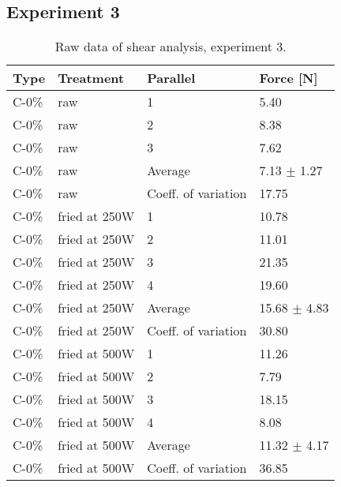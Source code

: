 \subsection{Experiment 3}
\begin{table}[H]
    \caption{Raw data of shear analysis, experiment 3.}
    \centering
    \begin{tabular}{lll|l}
\toprule

\textbf{Type} & \textbf{Treatment} & \textbf{Parallel} & \textbf{Force [N]}\\

\hline
C-0\% & raw   &   1       & 5.40 \\
C-0\% & raw   &   2       & 8.38 \\
C-0\% & raw   &   3       & 7.62 \\
C-0\% & raw   & Average   & 7.13 $\pm$ 1.27\\
C-0\% & raw   & Coeff. of variation & 17.75 \\
\hline
C-0\% & fried at 250W      &   1       & 10.78 \\
C-0\% & fried at 250W      &   2       & 11.01 \\
C-0\% & fried at 250W      &   3       & 21.35 \\
C-0\% & fried at 250W      &   4       & 19.60 \\
C-0\% & fried at 250W      & Average   & 15.68 $\pm$ 4.83 \\
C-0\% & fried at 250W      & Coeff. of variation & 30.80 \\
\hline
C-0\% & fried at 500W      &   1       & 11.26 \\
C-0\% & fried at 500W      &   2       & 7.79 \\
C-0\% & fried at 500W      &   3       & 18.15 \\
C-0\% & fried at 500W      &   4       & 8.08 \\
C-0\% & fried at 500W      & Average   & 11.32 $\pm$ 4.17 \\
C-0\% & fried at 500W      & Coeff. of variation & 36.85 \\
\bottomrule
    \end{tabular}%
    \label{tab:RawData:ShearForce:Exp3}
\end{table}

